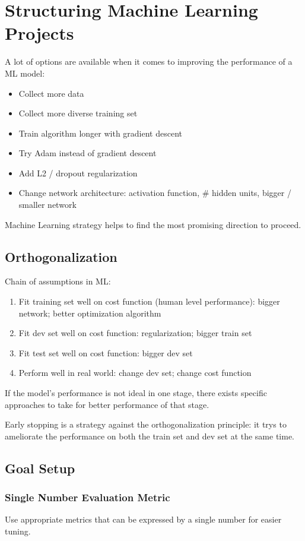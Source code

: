\ifx\PREAMBLE\undefined


\fi
\chapter{Structuring Machine Learning Projects}
A lot of options are available when it comes to improving the performance of a ML model:
\begin{itemize}
  \item Collect more data
  \item Collect more diverse training set
  \item Train algorithm longer with gradient descent
  \item Try Adam instead of gradient descent
  \item Add L2 / dropout regularization
  \item Change network architecture: activation function, \# hidden units, bigger / smaller network
\end{itemize}
Machine Learning strategy helps to find the most promising direction to proceed.
\section{Orthogonalization}
Chain of assumptions in ML:
\begin{enumerate}
  \item Fit training set well on cost function (human level performance): bigger network; better optimization algorithm
  \item Fit dev set well on cost function: regularization; bigger train set
  \item Fit test set well on cost function: bigger dev set
  \item Perform well in real world: change dev set; change cost function
\end{enumerate}
If the model's performance is not ideal in one stage, there exists specific approaches to take for better performance of that stage.

Early stopping is a strategy against the orthogonalization principle: it trys to ameliorate the performance on both the train set and dev set at the same time.
\section{Goal Setup}
\subsection{Single Number Evaluation Metric}
Use appropriate metrics that can be expressed by a single number for easier tuning.

